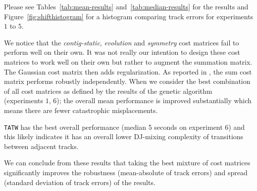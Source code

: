 \documentclass[twocolumn]{article}
\begin{document}
Please see Tables~\ref{tab:mean-results} and~\ref{tab:median-results} for the results and Figure~\ref{fig:shifthistogram} for a histogram comparing track errors for experiments $1$ to $5$.

We notice that the \textit{contig-static}, \textit{evolution} and \textit{symmetry} cost matrices fail to perform well on their own. It was not really our intention to design these cost matrices to work well on their own but rather to augment the summation matrix. The Gaussian cost matrix then adds regularization. As reported in \cite{scarfe2013long}, the sum cost matrix performs robustly independently. When we consider the best combination of all cost matrices as defined by the results of the genetic algorithm (experiments $1$, $6$); the overall mean performance is improved substantially which means there are fewer catastrophic misplacements. 

\texttt{TATW} has the best overall performance (median 5 seconds on experiment $6$) and this likely indicates it has an overall lower DJ-mixing complexity of transitions between adjacent tracks. 

We can conclude from these results that taking the best mixture of cost matrices significantly improves the robustness (mean-absolute of track errors) and spread (standard deviation of track errors) of the results. 
\end{document}
